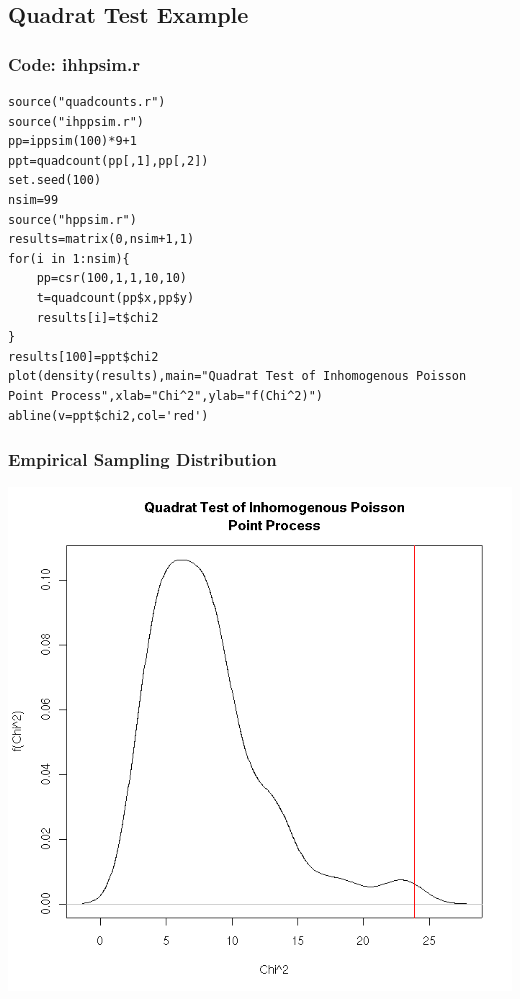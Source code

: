 \documentclass[nototal,handout]{beamer}
\begin{document}
\subsection{Quadrat Test Example}

  \begin{frame}[containsverbatim]
    \frametitle{Code: ihhpsim.r}
    \begin{small}
      \begin{verbatim}
source("quadcounts.r")
source("ihppsim.r")
pp=ippsim(100)*9+1
ppt=quadcount(pp[,1],pp[,2])
set.seed(100)
nsim=99
source("hppsim.r")
results=matrix(0,nsim+1,1)
for(i in 1:nsim){
    pp=csr(100,1,1,10,10)
    t=quadcount(pp$x,pp$y)
    results[i]=t$chi2
}
results[100]=ppt$chi2
plot(density(results),main="Quadrat Test of Inhomogenous Poisson
Point Process",xlab="Chi^2",ylab="f(Chi^2)")
abline(v=ppt$chi2,col='red')
      \end{verbatim}
    \end{small}
   \end{frame}



\begin{frame}[<+->] 
    \frametitle{Empirical Sampling Distribution}
    \begin{center}
      \includegraphics[width=.65\linewidth]{mcsim.png}
    \end{center}
  \end{frame}
\end{document}

